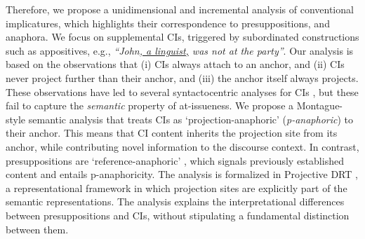 \documentclass[a4paper,12pt]{article}
\begin{document}
Therefore, we propose a unidimensional and incremental analysis of
conventional implicatures, which highlights their correspondence to
presuppositions, and anaphora.  We focus on supplemental CIs, triggered by
subordinated constructions such as appositives, e.g.,
\emph{``John\underline{, a linguist,} was not at the party''}. Our analysis
is based on the observations that (i) CIs always attach to an anchor, and
(ii) CIs never project further than their anchor, and (iii) the anchor
itself always projects.  These observations have led to several
syntactocentric analyses for CIs
\cite[e.g.,][]{nouwen2007appositives-short,schlenker2013supplements}, but
these fail to capture the \emph{semantic} property of at-issueness. We
propose a Montague-style semantic analysis that treats CIs as
`projection-anaphoric' (\emph{p-anaphoric}) to their anchor. This means that
CI content inherits the projection site from its anchor, while contributing
novel information to the discourse context. In contrast, presuppositions are
`reference-anaphoric' \citep[cf.][]{sandt1992presupposition-short}, which
signals previously established content and entails p-anaphoricity. The
analysis is formalized in Projective DRT \cite{venhuizen2013iwcs-short},
a representational framework in which projection sites are explicitly part
of the semantic representations.  The analysis explains the interpretational
differences between presuppositions and CIs, without stipulating
a fundamental distinction between them.

\vspace{-0.4cm}
\end{document}
